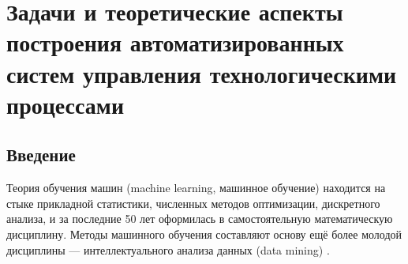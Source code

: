 \chapter{Задачи и теоретические аспекты построения автоматизированных систем управления технологическими процессами} \label{chapt1}

\section{Введение}

Теория обучения машин (machine learning, машинное обучение) находится на стыке прикладной статистики, численных методов оптимизации, дискретного анализа, и за последние 50 лет оформилась в самостоятельную математическую дисциплину. Методы машинного обучения составляют основу ещё более молодой дисциплины — интеллектуального анализа данных (data mining) \cite{воронцов2009машинное, marsland2015machineconway2012machine}.

